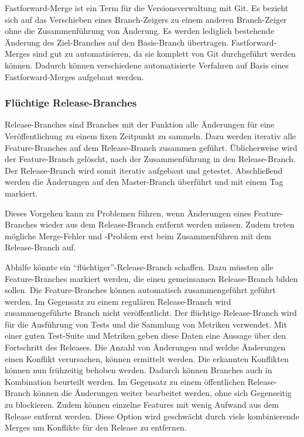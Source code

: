 Fastforward-Merge ist ein Term für die Versionsverwaltung mit Git. Es bezieht sich auf das Verschieben eines Branch-Zeigers zu einem anderen Branch-Zeiger ohne die Zusammenführung von Änderung. Es werden lediglich bestehende Änderung des Ziel-Branches auf den Basis-Branch übertragen.
Fastforward-Merges sind gut zu automatisieren, da sie komplett von Git durchgeführt werden können. Dadurch können verschiedene automatisierte Verfahren auf Basis eines Fastforward-Merges aufgebaut werden.

\subsubsection{Flüchtige Release-Branches}

Release-Branches sind Branches mit der Funktion alle Änderungen für eine Veröffentlichung zu einem fixen Zeitpunkt zu sammeln. Dazu werden iterativ alle Feature-Branches auf dem Release-Branch zusammen geführt. Üblicherweise wird der Feature-Branch gelöscht, nach der Zusammenführung in den Release-Branch. Der Release-Branch wird somit iterativ aufgebaut und getestet. Abschließend werden die Änderungen auf den Master-Branch überführt und mit einem Tag markiert.

Dieses Vorgehen kann zu Problemen führen, wenn Änderungen eines Feature-Branches wieder aus dem Release-Branch entfernt werden müssen. Zudem treten mögliche Merge-Fehler und -Problem erst beim Zusammenführen mit dem Release-Branch auf.

Abhilfe könnte ein ``flüchtiger''-Release-Branch schaffen. Dazu müssten alle Feature-Branches markiert werden, die einen gemeinsamen Release-Branch bilden sollen. Die Feature-Branches können automatisch zusammengeführt geführt werden. Im Gegensatz zu einem regulären Release-Branch wird zusammengeführte Branch nicht veröffentlicht. Der flüchtige Release-Branch wird für die Ausführung von Tests und die Sammlung von Metriken verwendet. Mit einer guten Test-Suite und Metriken geben diese Daten eine Aussage über den Fortschritt des Releases. Die Anzahl von Änderungen und welche Änderungen einen Konflikt verursachen, können ermittelt werden. Die erkannten Konflikten können nun frühzeitig behoben werden. Dadurch können Branches auch in Kombination beurteilt werden. Im Gegensatz zu einem öffentlichen Release-Branch können die Änderungen weiter bearbeitet werden, ohne sich Gegenseitig zu blockieren. Zudem können einzelne Features mit wenig Aufwand aus dem Release entfernt werden. Diese Option wird geschwächt durch viele kombinierende Merges um Konflikte für den Release zu entfernen.

